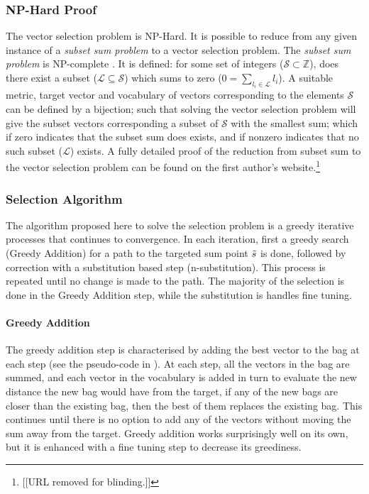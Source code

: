 \documentclass[11pt]{article}
\theoremstyle{plain}
\theoremstyle{definition}
\begin{document}
\subsubsection{NP-Hard Proof}
The vector selection problem is NP-Hard. It is possible to reduce from any given instance of a \emph{subset sum problem} to a vector selection problem. The \emph{subset sum problem} is NP-complete \parencite{karp1972reducibility}. It is defined: for some set of integers ($\mathcal{S}\subset\mathbb{Z}$), does there exist a subset ($\mathcal{L}\subseteq\mathcal{S}$) which sums to zero ($0=\sum_{l_i\in \mathcal{L}} l_i$).  A suitable metric, target vector and  vocabulary of vectors corresponding to the elements $\mathcal{S}$ can be defined by a bijection; such that solving the vector selection problem will give the subset vectors corresponding a subset of $\mathcal{S}$ with the smallest sum; which if zero indicates that the subset sum does exists, and if nonzero indicates that no such subset ($\mathcal{L}$) exists. A fully detailed proof of the reduction from subset sum to the vector selection problem can be found on the first author's website.\footnote{[[URL removed for blinding.]]}

\subsubsection{Selection Algorithm}
The algorithm proposed here to solve the selection problem is a greedy iterative processes that continues to convergence. In each iteration, first a greedy search (Greedy Addition) for a path to the targeted sum point $\tilde{s}$ is done, followed by correction with a substitution based step (n-substitution). This process is repeated until no change is made to the path. The majority of the selection is done in the Greedy Addition step, while the substitution is handles fine tuning.

\paragraph{Greedy Addition}
The greedy addition step is characterised by adding the best vector to the bag at each step (see the pseudo-code in ). At each step, all the vectors in the bag are summed, and each vector in the vocabulary is added in turn to evaluate the new distance the new bag would have from the target, if any of the new bags are closer than the existing bag, then the best of them replaces the existing bag. This continues until there is no option to add any of the vectors without moving the sum away from the target. Greedy addition works surprisingly well on its own, but it is enhanced with a fine tuning step to decrease its greediness.
\end{document}
